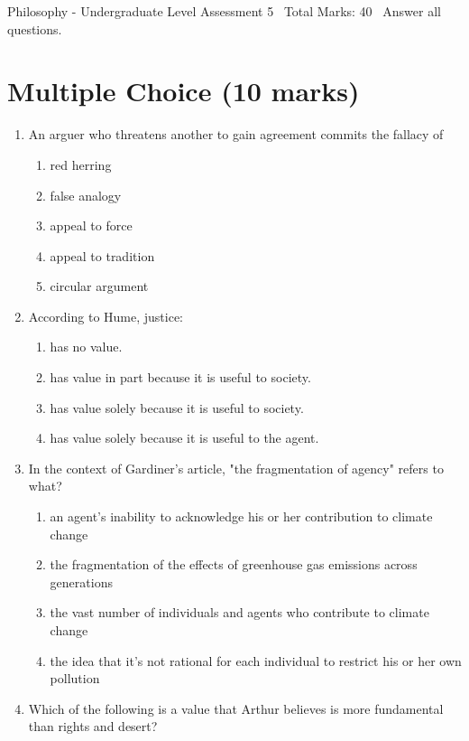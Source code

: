 \documentclass[12pt]{article}
\begin{document}
\begin{center}
Philosophy - Undergraduate Level Assessment 5 \
Total Marks: 40 \
Answer all questions.
\end{center}

\section*{Multiple Choice (10 marks)}
\begin{enumerate}[label=\arabic*.]
\item An arguer who threatens another to gain agreement commits the fallacy of
\begin{enumerate}[label=(\alph*)]
    \item red herring
    \item false analogy
    \item appeal to force
    \item appeal to tradition
    \item circular argument
\end{enumerate}
\item According to Hume, justice:
\begin{enumerate}[label=(\alph*)]
    \item has no value.
    \item has value in part because it is useful to society.
    \item has value solely because it is useful to society.
    \item has value solely because it is useful to the agent.
\end{enumerate}
\item In the context of Gardiner's article, "the fragmentation of agency" refers to what?
\begin{enumerate}[label=(\alph*)]
    \item an agent's inability to acknowledge his or her contribution to climate change
    \item the fragmentation of the effects of greenhouse gas emissions across generations
    \item the vast number of individuals and agents who contribute to climate change
    \item the idea that it's not rational for each individual to restrict his or her own pollution
\end{enumerate}
\item Which of the following is a value that Arthur believes is more fundamental than rights and desert?
\begin{enumerate}[label=(\alph*)]

\end{enumerate}
\end{enumerate}
\end{document}
